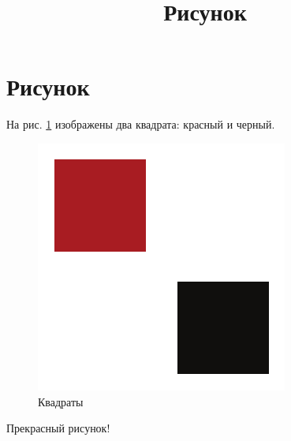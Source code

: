 \documentclass[a4paper,12pt]{article}
\title{Рисунок}
\begin{document}
\section*{Рисунок}

На рис. \ref{squares} изображены два квадрата: красный и черный.

\begin{figure}[bhtp]
\centering
\includegraphics{figure}
\caption{Квадраты}\label{squares}
\end{figure}

Прекрасный рисунок!
\end{document}
